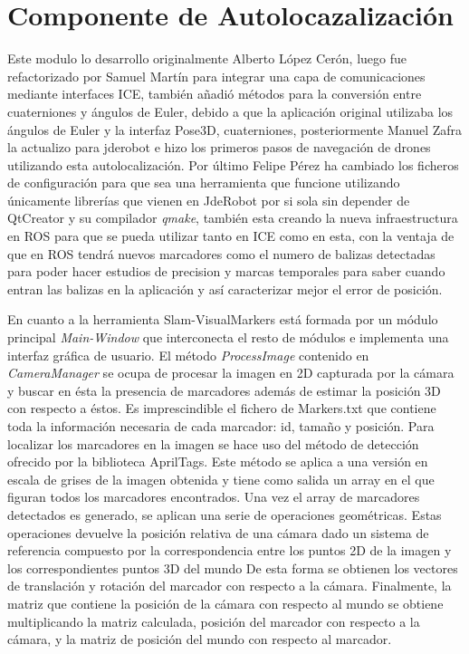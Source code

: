 \section{Componente de Autolocazalización} 
\hspace{1cm} Este modulo lo desarrollo originalmente Alberto López Cerón, luego fue refactorizado por Samuel Martín para integrar una capa de comunicaciones mediante interfaces ICE, también añadió métodos para la conversión entre cuaterniones y ángulos de Euler, debido a que la aplicación original utilizaba los ángulos de Euler y la interfaz Pose3D, cuaterniones, posteriormente Manuel Zafra la actualizo para jderobot e hizo los primeros pasos de navegación de drones utilizando esta autolocalización. Por último Felipe Pérez ha cambiado los ficheros de configuración para que sea una herramienta que funcione utilizando únicamente librerías que vienen en JdeRobot por si sola sin depender de QtCreator y su compilador \textit{qmake}, también esta creando la nueva infraestructura en ROS para que se pueda utilizar tanto en ICE como en esta, con la ventaja de que en ROS tendrá nuevos marcadores como el numero de balizas detectadas para poder hacer estudios de precision y marcas temporales para saber cuando entran las balizas en la aplicación y así caracterizar mejor el error de posición. 

\hspace{1cm} En cuanto a la herramienta Slam-VisualMarkers  está formada por un módulo principal \textit{Main-Window} que interconecta el resto de módulos e implementa una interfaz gráfica de usuario. El método \textit{ProcessImage} contenido en \textit{CameraManager} se ocupa de procesar la imagen en 2D capturada por la cámara y buscar en ésta la presencia de marcadores además de estimar la posición 3D con respecto a éstos. Es imprescindible el fichero de Markers.txt que contiene toda la información necesaria de cada marcador: id, tamaño y posición. Para localizar los marcadores en la imagen se hace uso del método de detección ofrecido por la biblioteca AprilTags. Este método se aplica a una versión en escala de grises de la imagen obtenida y tiene como salida un array en el que figuran todos los marcadores encontrados. Una vez el array de marcadores detectados es generado, se aplican una serie de operaciones geométricas. Estas operaciones devuelve la posición relativa de una cámara dado un sistema de referencia compuesto por la correspondencia entre los puntos 2D de la imagen y los correspondientes puntos 3D del mundo De esta forma se obtienen los vectores de translación y rotación del marcador con respecto a la cámara. Finalmente, la matriz que contiene la posición de la cámara con respecto al mundo se obtiene multiplicando la matriz calculada, posición del marcador con respecto a la cámara, y la matriz de posición del mundo con respecto al marcador. 

